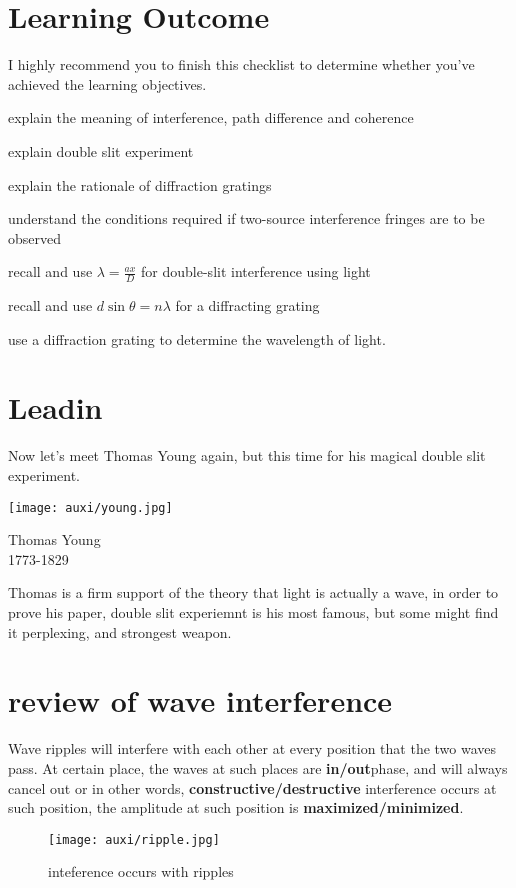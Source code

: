 \documentclass[a4paper]{tufte-handout}
\title{}
\author{Sanjin Zhao}
\date{20th Nov, 2022}  %
\begin{document}
\maketitle%
\section*{Learning Outcome}
I highly recommend you to finish this checklist to determine whether you've achieved the learning objectives.
\begin{todolist}
  \item explain the meaning of interference, path difference and coherence
  \item explain double slit experiment
  \item explain the rationale of diffraction gratings
  \item understand the conditions required if two-source interference fringes are to be observed
  \item recall and use $\lambda = \frac{ax}{D}$ for double-slit interference using light
  \item recall and use $d\sin\theta =n \lambda$ for a diffracting grating
  \item use a diffraction grating to determine the wavelength of light.
\end{todolist}
\clearpage

\section{Leadin}
Now let's meet Thomas Young again, but this time for his magical double slit experiment.
\begin{marginfigure}
\texttt{[image: auxi/young.jpg]}
\caption{Thomas Young\\1773-1829}
\end{marginfigure}
Thomas is a firm support of the theory that light is actually a wave, in order to prove his paper, double slit experiemnt is his most famous, but some might find it perplexing, and strongest weapon.

\section{review of wave interference}
Wave ripples will interfere with each other at every position that the two waves pass. At certain place, the waves at such places are \textbf{in/out}phase, and  will always cancel out or in other words, \textbf{constructive/destructive} interference occurs at such position, the amplitude at such position is \textbf{maximized/minimized}.
\begin{figure}[h]
\centering
\texttt{[image: auxi/ripple.jpg]}
\caption{inteference occurs with ripples}
\label{fig:ripple}
\end{figure}
\end{document}
